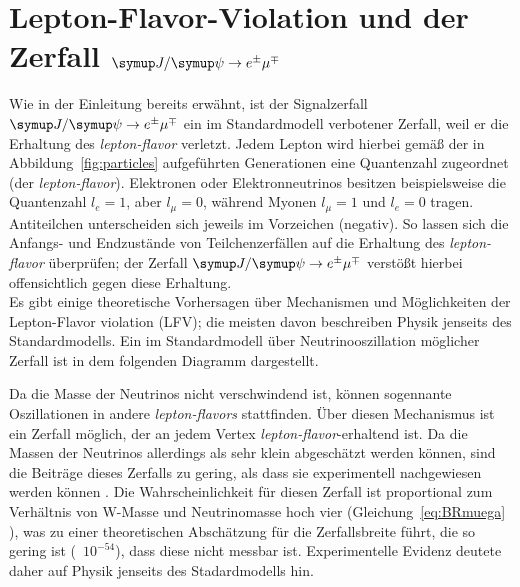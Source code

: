 \section{\texorpdfstring{Lepton-Flavor-Violation und der Zerfall $\signal$}{Jpsi to eµ}}
%
Wie in der Einleitung bereits erwähnt, ist der Signalzerfall $\signal$ ein im Standardmodell verbotener Zerfall, weil er die Erhaltung des \textit{lepton-flavor} verletzt. Jedem Lepton wird hierbei gemäß der in Abbildung~\ref{fig:particles} aufgeführten Generationen eine Quantenzahl zugeordnet (der \textit{lepton-flavor}). Elektronen oder Elektronneutrinos besitzen beispielsweise die Quantenzahl $l_e=1$, aber $l_\mu=0$, während Myonen $l_\mu=1$ und $l_e=0$ tragen. Antiteilchen unterscheiden sich jeweils im Vorzeichen (negativ). So lassen sich die Anfangs- und Endzustände von Teilchenzerfällen auf die Erhaltung des \textit{lepton-flavor} überprüfen; der Zerfall $\signal$ verstößt hierbei offensichtlich gegen diese Erhaltung.\\
%
Es gibt einige theoretische Vorhersagen über Mechanismen und Möglichkeiten der Lepton-Flavor violation (LFV); die meisten davon beschreiben Physik jenseits des Standardmodells. Ein im Standardmodell über Neutrinooszillation möglicher Zerfall ist in dem folgenden Diagramm dargestellt.
%
\begin{figure}[H]
  \centering
  \label{fig:lfv_nu}
\end{figure}
%
Da die Masse der Neutrinos nicht verschwindend ist, können sogennante Oszillationen in andere \textit{lepton-flavors} stattfinden. Über diesen Mechanismus ist ein Zerfall möglich, der an jedem Vertex \textit{lepton-flavor}-erhaltend ist. Da die Massen der Neutrinos allerdings als sehr klein abgeschätzt werden können, sind die Beiträge dieses Zerfalls zu gering, als dass sie experimentell nachgewiesen werden können \cite{neutrino}. Die Wahrscheinlichkeit für diesen Zerfall ist proportional zum Verhältnis von W-Masse und Neutrinomasse hoch vier (Gleichung~\ref{eq:BRmuega} \cite{neutrino}), was zu einer theoretischen Abschätzung für die Zerfallsbreite führt, die so gering ist (~$10^{-54}$), dass diese nicht messbar ist. Experimentelle Evidenz deutete daher auf Physik jenseits des Stadardmodells hin.
